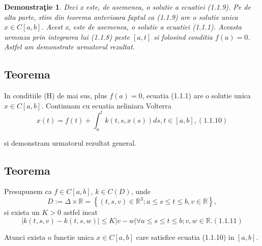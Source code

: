\documentclass[a4paper,12pt,oneside]{report}
\newtheorem{demonstration}{Demonstra\c tie}
\begin{document}
\begin{demonstration}
	Deci x este, de asemenea, o solutie a ecuatiei (1.1.9). Pe de alta parte, stim din teorema anterioara faptul ca (1.1.9) are o solutie unica \(x\in C\left [ a,b \right ]\). Acest x, este de asemenea, o solutie a ecuatiei (1.1.1). Aceasta urmeaza prin integrarea lui (1.1.8) peste \(\left [ a,t \right ]\) si folosind conditia \(f\left ( a \right ) = 0\). Astfel am demonstrate urmatorul rezultat. 
\end{demonstration}

\subsection{Teorema}

In conditiile (H) de mai sus, plus \(f\left ( a \right ) = 0\), ecuatia (1.1.1) are o solutie unica \(x \in C\left [ a,b \right ]\).
Continuam cu ecuatia neliniara Volterra 
\begin{displaymath}
	x\left ( t \right ) = f\left ( t \right ) + \int_{a}^{t}k\left ( t,s,x\left ( s \right ) \right )ds, t\in \left [ a,b \right ], (1.1.10)
\end{displaymath}

si demonstram urmatorul rezultat general. 

\subsection{Teorema}

Presupunem ca \(f\in C\left [ a,b \right ]\), \(k\in C\left ( D \right )\), unde 
\begin{displaymath}
	D:= \Delta \times \mathbb{R} = \left \{ \left ( t,s,v \right )\in \mathbb{R}^{3}; a\leq s\leq t\leq b, v\in \mathbb{R}\right \}, 
\end{displaymath}
si exista un \(K> 0\) astfel incat
\begin{displaymath}
	\left | k\left ( t,s,v \right )  - k\left ( t,s,w \right )\right |\leq K\left | v-w \right |\forall a\leq s\leq t\leq b; v,w\in \mathbb{R}.(1.1.11)
\end{displaymath}

Atunci exista o functie unica \(x\in C\left [ a,b \right ]\) care satisfice ecuatia (1.1.10) in \(\left [ a,b \right ]\).
\end{document}
